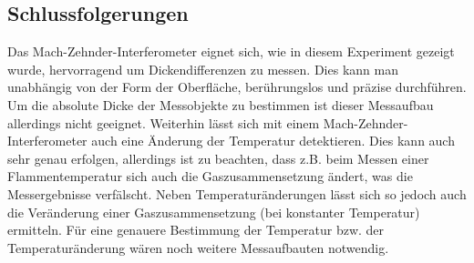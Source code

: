 \subsection*{Schlussfolgerungen}
Das Mach-Zehnder-Interferometer eignet sich, wie in diesem Experiment gezeigt wurde, hervorragend um Dickendifferenzen zu messen. Dies kann man unabhängig von der Form der Oberfläche, berührungslos und präzise durchführen. Um die absolute Dicke der Messobjekte zu bestimmen ist dieser Messaufbau allerdings nicht geeignet.
Weiterhin lässt sich mit einem Mach-Zehnder-Interferometer auch eine Änderung der Temperatur detektieren. Dies kann auch sehr genau erfolgen, allerdings ist zu beachten, dass z.B. beim Messen einer Flammentemperatur sich auch die Gaszusammensetzung ändert, was die Messergebnisse verfälscht. 
Neben Temperaturänderungen lässt sich so jedoch auch die Veränderung einer Gaszusammensetzung (bei konstanter Temperatur) ermitteln. Für eine genauere Bestimmung der Temperatur bzw. der Temperaturänderung wären noch weitere Messaufbauten notwendig.  


